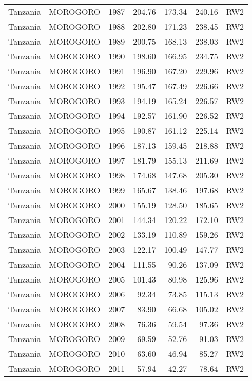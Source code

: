 \begin{longtable}{lllrrrl}
  Tanzania & MOROGORO & 1987 & 204.76 & 173.34 & 240.16 & RW2 \\ 
  Tanzania & MOROGORO & 1988 & 202.80 & 171.23 & 238.45 & RW2 \\ 
  Tanzania & MOROGORO & 1989 & 200.75 & 168.13 & 238.03 & RW2 \\ 
  Tanzania & MOROGORO & 1990 & 198.60 & 166.95 & 234.75 & RW2 \\ 
  Tanzania & MOROGORO & 1991 & 196.90 & 167.20 & 229.96 & RW2 \\ 
  Tanzania & MOROGORO & 1992 & 195.47 & 167.49 & 226.66 & RW2 \\ 
  Tanzania & MOROGORO & 1993 & 194.19 & 165.24 & 226.57 & RW2 \\ 
  Tanzania & MOROGORO & 1994 & 192.57 & 161.90 & 226.52 & RW2 \\ 
  Tanzania & MOROGORO & 1995 & 190.87 & 161.12 & 225.14 & RW2 \\ 
  Tanzania & MOROGORO & 1996 & 187.13 & 159.45 & 218.88 & RW2 \\ 
  Tanzania & MOROGORO & 1997 & 181.79 & 155.13 & 211.69 & RW2 \\ 
  Tanzania & MOROGORO & 1998 & 174.68 & 147.68 & 205.30 & RW2 \\ 
  Tanzania & MOROGORO & 1999 & 165.67 & 138.46 & 197.68 & RW2 \\ 
  Tanzania & MOROGORO & 2000 & 155.19 & 128.50 & 185.65 & RW2 \\ 
  Tanzania & MOROGORO & 2001 & 144.34 & 120.22 & 172.10 & RW2 \\ 
  Tanzania & MOROGORO & 2002 & 133.19 & 110.89 & 159.26 & RW2 \\ 
  Tanzania & MOROGORO & 2003 & 122.17 & 100.49 & 147.77 & RW2 \\ 
  Tanzania & MOROGORO & 2004 & 111.55 & 90.26 & 137.09 & RW2 \\ 
  Tanzania & MOROGORO & 2005 & 101.43 & 80.98 & 125.96 & RW2 \\ 
  Tanzania & MOROGORO & 2006 & 92.34 & 73.85 & 115.13 & RW2 \\ 
  Tanzania & MOROGORO & 2007 & 83.90 & 66.68 & 105.02 & RW2 \\ 
  Tanzania & MOROGORO & 2008 & 76.36 & 59.54 & 97.36 & RW2 \\ 
  Tanzania & MOROGORO & 2009 & 69.59 & 52.76 & 91.03 & RW2 \\ 
  Tanzania & MOROGORO & 2010 & 63.60 & 46.94 & 85.27 & RW2 \\ 
  Tanzania & MOROGORO & 2011 & 57.94 & 42.27 & 78.64 & RW2 \\ 

\end{longtable}
